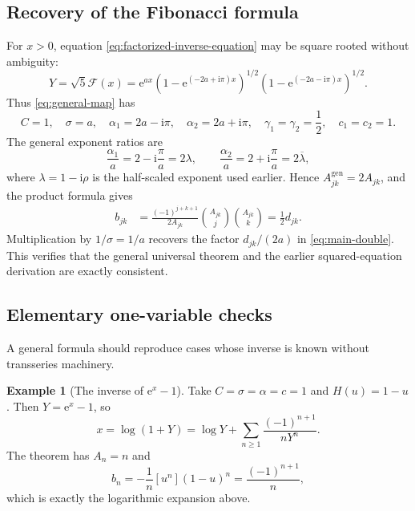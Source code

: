 \documentclass[11pt,oneside]{article}
\theoremstyle{plain}
\theoremstyle{definition}
\newtheorem{example}[theorem]{Example}
\theoremstyle{remark}
\newcommand{\e}{\mathrm{e}}
\newcommand{\ii}{\mathrm{i}}
\newcommand{\Fcal}{\mathcal{F}}
\begin{document}
\subsection{Recovery of the Fibonacci formula}

For \(x>0\), equation \eqref{eq:factorized-inverse-equation} may be square
rooted without ambiguity:
\begin{equation}
 Y=\sqrt5\Fcal(x)
 =\e^{ax}
 \left(1-\e^{(-2a+\ii\pi)x}\right)^{1/2}
 \left(1-\e^{(-2a-\ii\pi)x}\right)^{1/2}.
 \label{eq:F-general-form}
\end{equation}
Thus \eqref{eq:general-map} has
\begin{equation}
 C=1,
 \quad \sigma=a,
 \quad
 \alpha_1=2a-\ii\pi,
 \quad
 \alpha_2=2a+\ii\pi,
 \quad
 \gamma_1=\gamma_2=\frac12,
 \quad c_1=c_2=1.
 \label{eq:F-general-parameters}
\end{equation}
The general exponent ratios are
\begin{equation}
 \frac{\alpha_1}{a}=2-\ii\frac\pi a=2\lambda,
 \qquad
 \frac{\alpha_2}{a}=2+\ii\frac\pi a=2\overline\lambda,
 \label{eq:F-general-lambdas}
\end{equation}
where \(\lambda=1-\ii\rho\) is the half-scaled exponent used earlier.  Hence
\(A^{\mathrm{gen}}_{jk}=2A_{jk}\), and the product formula gives
\begin{align}
 b_{jk}
 &=\frac{(-1)^{j+k+1}}{2A_{jk}}
 \binom{A_{jk}}j\binom{A_{jk}}k
 =\frac12d_{jk}.
 \label{eq:F-b-vs-d}
\end{align}
Multiplication by \(1/\sigma=1/a\) recovers the factor
\(d_{jk}/(2a)\) in \eqref{eq:main-double}.  This verifies that the general
universal theorem and the earlier squared-equation derivation are exactly
consistent.

\subsection{Elementary one-variable checks}

A general formula should reproduce cases whose inverse is known without
transseries machinery.

\begin{example}[The inverse of \(\e^x-1\)]
Take \(C=\sigma=\alpha=c=1\) and \(H(u)=1-u\).  Then
\(Y=\e^x-1\), so
\[
 x=\log(1+Y)=\log Y+\sum_{n\ge1}\frac{(-1)^{n+1}}{nY^n}.
\]
The theorem has \(A_n=n\) and
\[
 b_n=-\frac1n[u^n](1-u)^n
 =\frac{(-1)^{n+1}}n,
\]
which is exactly the logarithmic expansion above.
\end{example}
\end{document}
